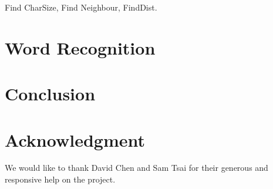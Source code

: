 \documentclass[conference]{IEEEtran}
\begin{document}
Find CharSize, Find Neighbour, FindDist.


\section{Word Recognition}

\section{Conclusion}

\section*{Acknowledgment}
We would like to thank David Chen and Sam Tsai for their generous and responsive help on the project.


\end{document}
